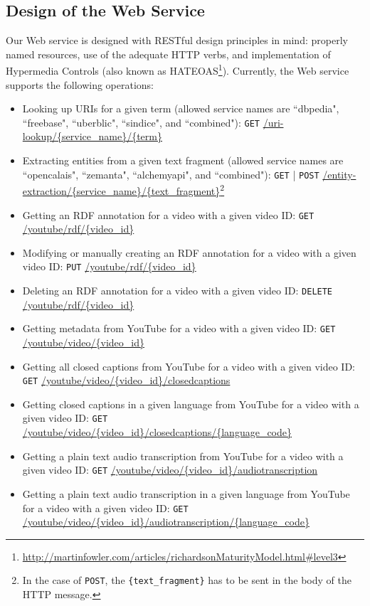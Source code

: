 \documentclass{acm_proc_article-sp}
\begin{document}
\subsection{Design of the Web Service}                                      \label{sec:design}

Our Web service is designed with RESTful design principles in mind: properly named resources, use of the adequate HTTP
verbs, and implementation of Hypermedia Controls (also known as
HATEOAS\footnote{\url{http://martinfowler.com/articles/richardsonMaturityModel.html#level3}}). Currently, the Web
service supports the following operations:
\begin{itemize}
\item Looking up URIs for a given term (allowed service names are ``dbpedia", ``freebase", ``uberblic", ``sindice", and ``combined"): \texttt{GET} \url{/uri-lookup/{service_name}/{term}}
\item Extracting entities from a given text fragment (allowed service names are ``opencalais", ``zemanta", ``alchemyapi", and ``combined"): \texttt{GET} | \texttt{POST} \url{/entity-extraction/{service_name}/{text_fragment}}\footnote{In the case of \texttt{POST}, the \texttt{\{text\_fragment\}} has to be sent in the body of the HTTP message.}
\item Getting an RDF annotation for a video with a given video ID: \texttt{GET} \url{/youtube/rdf/{video_id}}
\item Modifying or manually creating an RDF annotation for a video with a given video ID: \texttt{PUT} \url{/youtube/rdf/{video_id}}
\item Deleting an RDF annotation for a video with a given video ID: \texttt{DELETE} \url{/youtube/rdf/{video_id}}
\item Getting metadata from YouTube for a video with a given video ID: \texttt{GET} \url{/youtube/video/{video_id}}
\item Getting all closed captions from YouTube for a video with a given video ID: \texttt{GET} \url{/youtube/video/{video_id}/closedcaptions}
\item Getting closed captions in a given language from YouTube for a video with a given video ID: \texttt{GET} \url{/youtube/video/{video_id}/closedcaptions/{language_code}}
\item Getting a plain text audio transcription from YouTube for a video with a given video ID: \texttt{GET} \url{/youtube/video/{video_id}/audiotranscription}
\item Getting a plain text audio transcription in a given language from YouTube for a video with a given video ID: \texttt{GET} \url{/youtube/video/{video_id}/audiotranscription/{language_code}}
\end{itemize}
\end{document}
